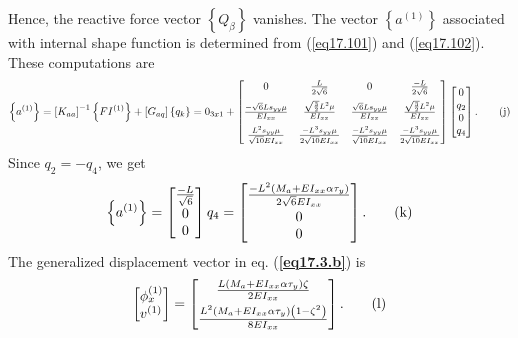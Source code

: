 \documentclass{AeroStructure-ERJohnson}
\begin{document}
\begin{example}
\begin{equation}
\end{equation}
Hence, the reactive force vector $\left\{Q_{\beta}\right\}$ vanishes. The vector $\left\{a^{(1)}\right\}$ associated with internal shape function is determined from (\ref{eq17.101}) and (\ref{eq17.102}). These computations are
\begin{equation}
\left\{a^{(1)}\right\}=\left[K_{a a}\right]^{-1}\left\{F I^{(1)}\right\}+\left[G_{a q}\right]\left\{q_{k}\right\}=0_{3 x 1}+\left[\begin{array}{@{}cccc@{}}
0 & \frac{L}{2 \sqrt{6}} & 0 & \frac{-L}{2 \sqrt{6}} \\[7pt]
\frac{-\sqrt{6} L s_{y y}\mu}{E I_{x x}} & \frac{\sqrt{\frac{3}{2}} L^{2} \mu}{E I_{x x}} & \frac{\sqrt{6} L s_{y y} \mu}{E I_{x x}} & \frac{\sqrt{\frac{3}{2}} L^{2} \mu}{E I_{x x}} \\[7pt]
\frac{L^{2} s_{y y} \mu}{\sqrt{10} E I_{x x}} & \frac{-L^{3} s_{y y} \mu}{2 \sqrt{10} E I_{x x}} & \frac{-L^{2} s_{y y} \mu}{\sqrt{10} E I_{x x}} & \frac{-L^{3} s_{y y} \mu}{2 \sqrt{10}EI_{xx}} \end{array}\right]\left[\begin{array}{@{}c@{}}0 \\
q_{2} \\
0 \\
q_{4}\end{array}\right]. \label{eq17.3.j}\tag{j}
\end{equation}
Since $q_{2}=-q_{4}$, we get
\begin{equation}
\left\{a^{(1)}\right\}=\left[\begin{array}{@{}c@{}}\frac{-L}{\sqrt{6}} \\0 \\0\end{array}\right] q_{4}=\left[\begin{array}{@{}c@{}}\frac{-L^{2}\left(M_{a}+E I_{x x} \alpha \tau_{y}\right)}{2 \sqrt{6} E I_{x x}} \\[4pt]0 \\0\end{array}\right]. \label{eq17.3.k}\tag{k}
\end{equation}
The generalized displacement vector in eq. (\textbf{\ref{eq17.3.b}}) is
\begin{equation}
\left[\begin{array}{@{}l@{}}\phi_{x}^{(1)} \\v^{(1)}\end{array}\right]=\left[\begin{array}{@{}c@{}}\frac{L\left(M_{a}+E I_{x x} \alpha \tau_{y}\right) \zeta}{2 E I_{x x}} \\[4pt]\frac{L^{2}\left(M_{a}+E I_{x x} \alpha \tau_{y}\right)\left(1-\zeta^{2}\right)}{8 E I_{x x}}\end{array}\right]. \label{eq17.3.l}\tag{l}

\end{equation}
\end{example}
\end{document}
